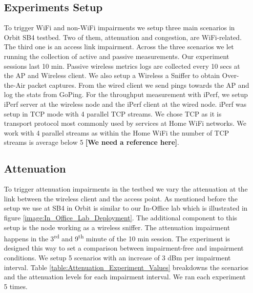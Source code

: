 \subsection*{Experiments Setup}

To trigger WiFi and non-WiFi impairments we setup three main scenarios in Orbit SB4 testbed. Two of them, attenuation and congestion, are WiFi-related. The third one is an access link impairment. Across the three scenarios we let running the collection of active and passive measurements. Our experiment sessions last 10 min. Passive wireless metrics logs are collected every 10 secs at the AP and Wireless client. We also setup a Wireless a Sniffer to obtain Over-the-Air packet captures. From the wired client we send pings towards the AP and log the stats from GoPing. For the throughput measurement with iPerf, we setup iPerf server at the wireless node and the iPerf client at the wired node. iPerf was setup in TCP mode with 4 parallel TCP streams. We chose TCP as it is transport protocol most commonly used by services at Home WiFi networks. We work with 4 parallel streams as within the Home WiFi the number of TCP streams is average below 5 \textbf{[We need a reference here]}.

\subsection*{Attenuation}

To trigger attenuation impairments in the testbed we vary the attenuation at the link between the wireless client and the access point. As mentioned before the setup we use at SB4 in Orbit is similar to our In-Office lab which is illustrated in figure \ref{image:In_Office_Lab_Deployment}. The additional component to this setup is the node working as a wireless sniffer. The attenuation impairment happens in the 3\textsuperscript{rd} and 9\textsuperscript{th} minute of the 10 min session. The experiment is designed this way to set a comparison between impairment-free and impairment conditions. We setup 5 scenarios with an increase of 3 dBm per impairment interval. Table \ref{table:Attenuation_Experiment_Values} breakdowns the scenarios and the attenuation levels for each impairment interval. We ran each experiment 5 times.

